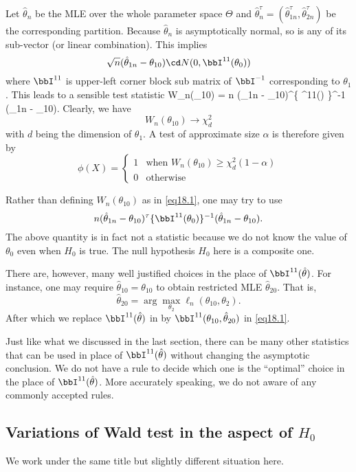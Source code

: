 Let $\hat \theta_n$ be the MLE over the whole parameter space $\Theta$ and
$\hat \theta_n^\tau = (\hat \theta_{1n}^\tau, \hat \theta_{2n}^\tau)$ 
be the corresponding partition. 
Because $\hat \theta_n$ is asymptotically normal, so is any
of its sub-vector (or linear combination). This implies
\[
\sqrt{n} (\hat \theta_{1n} - \theta_{10}) \cd N(0, \bbI^{11}( \theta_0))
\]
where $\bbI^{11}$ is upper-left corner block sub matrix of $\bbI^{-1}$ corresponding
to $\theta_1$. This leads to a sensible test statistic
\be
W_n(\theta_{10}) 
=
n (\hat \theta_{1n} - \theta_{10})^\tau \{ \bbI^{11}(\hat \theta) \}^{-1} (\hat \theta_{1n} - \theta_{10}).
\label{eq18.1}
\ee
Clearly, we have
\[
W_n(\theta_{10})  \to \chi_d^2
\]
with $d$ being the dimension of $\theta_1$. 
A test of approximate size $\alpha$ is therefore given by
\[
\phi(X) = 
\left \{
\begin{array} {ll}
1 & \mbox{when  } W_n(\theta_{10} )\geq \chi_d^2(1 - \alpha) \\
0 & \mbox{otherwise}
\end{array}
\right .
\]

Rather than defining $W_n(\theta_{10})$ as in \eqref{eq18.1}, one
may try to use
\[
n (\hat \theta_{1n} - \theta_{10})^\tau \{ \bbI^{11}(\theta_0) \}^{-1} (\hat \theta_{1n} - \theta_{10}).
\]
The above quantity is in fact not a statistic because
we do not know the value of $\theta_0$ even when $H_0$ is true.
The null hypothesis $H_0$ here is a composite one.

There are, however, many well justified choices in the place of  $\bbI^{11}(\hat \theta)$. 
For instance, one may require $\hat \theta_{10} =  \theta_{10}$
to obtain restricted MLE $ \hat \theta_{20}$. That is,
\[
\hat \theta_{20} = \arg\max_{\theta_2} \ell_n(\theta_{10}, \theta_2).
\]
After which we replace
$\bbI^{11}(\hat \theta)$ in by
$\bbI^{11}(\theta_{10}, \hat \theta_{20})$ in \eqref{eq18.1}. 

Just like what we discussed in the last section, there can be
many other statistics that can be used in place of
$\bbI^{11}(\hat \theta)$ without changing the asymptotic
conclusion.
We do not have a rule to decide which one
is the ``optimal'' choice in the place of $\bbI^{11}(\hat \theta)$.
More accurately speaking, we do not aware of any commonly
accepted rules.

\subsection{Variations of Wald test in the aspect of $H_0$}
We work under the same title but slightly different situation
here.

